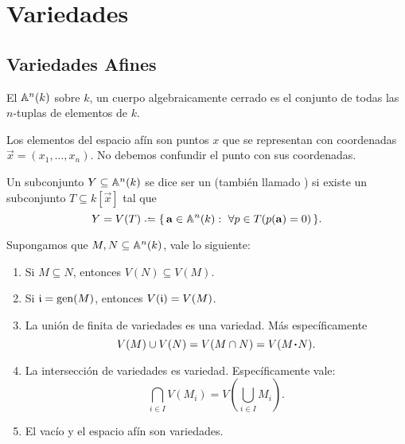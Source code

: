 \documentclass[12pt]{memoir}
\begin{document}

\chapter{Variedades}

\section{Variedades Afines}

\begin{Def}
El  $\mathbb{A}^n(k)$ sobre $k$, un cuerpo algebraicamente cerrado es el conjunto de todas las $n$-tuplas de elementos de $k$.
\end{Def}

Los elementos del espacio afín son puntos $x$ que se representan con coordenadas $\vec x=(x_1,\dots,x_n)$. No debemos confundir el punto con sus coordenadas.

\begin{Def}
   Un subconjunto $Y\subseteq\mathbb{A}^n(k)$ se dice ser un  (también llamado ) si existe un subconjunto $T\subseteq k[\vec x]$ tal que 
   $$Y=V(T)\defeq\set{\vec a\in\bA^n(k):\ \forall p\in T(p(\vec a)=0)}.$$
\end{Def}

\begin{Prop}
  Supongamos que $M,N\subseteq\mathbb{A}^n(k)$, vale lo siguiente:
  \begin{enumerate}
    \item Si $M\subseteq N$, entonces $V(N)\subseteq V(M)$.
    \item Si $\mathfrak{i} =\operatorname{gen}(M)$, entonces $V(\mathfrak{i})=V(M)$.
    \item La unión de finita de variedades es una variedad. Más específicamente 
    $$V(M)\cup V(N)=V(M\cap N)=V(M\.N).$$
    \item La intersección de variedades es variedad. Específicamente vale:
    $$\bigcap_{i\in I}V(M_i)=V\left(\bigcup_{i\in I}M_i\right).$$
    \item El vacío y el espacio afín son variedades.
  \end{enumerate}
\end{Prop}
\end{document}

